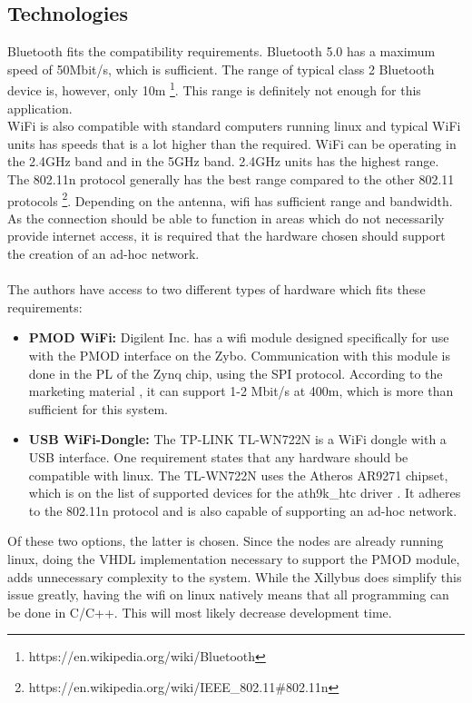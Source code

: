 \subsection{Technologies}
Bluetooth fits the compatibility requirements. 
Bluetooth 5.0 has a maximum speed of 50Mbit/s, which is sufficient.
The range of typical class 2 Bluetooth device is, however, only 10m \footnote{https://en.wikipedia.org/wiki/Bluetooth}.
This range is definitely not enough for this application.
\\
WiFi is also compatible with standard computers running linux and typical WiFi units has speeds that is a lot higher than the required. 
WiFi can be operating in the 2.4GHz band and in the 5GHz band. 
2.4GHz units has the highest range. 
The 802.11n protocol generally has the best range compared to the other 802.11 protocols \footnote{https://en.wikipedia.org/wiki/IEEE\_802.11\#802.11n}.
Depending on the antenna, wifi has sufficient range and bandwidth.
As the connection should be able to function in areas which do not necessarily provide internet access, it is required that the hardware chosen should support the creation of an ad-hoc network.\\~\\
The authors have access to two different types of hardware which fits these requirements:
\begin{itemize}
	\item \textbf{PMOD WiFi:} Digilent Inc. has a wifi module designed specifically for use with the PMOD interface on the Zybo.
	Communication with this module is done in the PL of the Zynq chip, using the SPI protocol.
	According to the marketing material \cite{pmodwifi}, it can support 1-2 Mbit/s at 400m, which is more than sufficient for this system.
	\item \textbf{USB WiFi-Dongle:} The TP-LINK TL-WN722N is a WiFi dongle with a USB interface. One requirement states that any hardware should be compatible with linux.
	The TL-WN722N uses the Atheros AR9271 chipset, which is on the list of supported devices for the ath9k\_htc driver \cite{ath9k}.
	It adheres to the 802.11n protocol and is also capable of supporting an ad-hoc network.

\end{itemize}
Of these two options, the latter is chosen.
Since the nodes are already running linux, doing the VHDL implementation necessary to support the PMOD module, adds unnecessary complexity to the system.
While the Xillybus does simplify this issue greatly, having the wifi on linux natively means that all programming can be done in C/C++.
This will most likely decrease development time.

